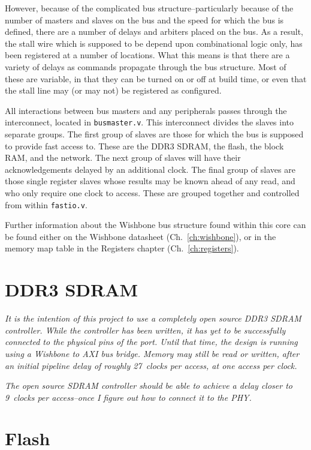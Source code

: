 \documentclass{gqtekspec}
\begin{document}
However, because of the complicated bus structure--particularly because of the
number of masters and slaves on the bus and the speed for which the bus is
defined, there are a number of delays and arbiters placed on the bus.  As a
result, the stall wire which is supposed to be depend upon combinational logic
only, has been registered at a number of locations.  What this means is that
there are a variety of delays as commands propagate through the bus structure.
Most of these are variable, in that they can be turned on or off at build time,
or even that the stall line may (or may not) be registered as configured.

All interactions between bus masters and any peripherals passes through the
interconnect, located in {\tt busmaster.v}.  This interconnect divides the
slaves into separate groups.  The first group of slaves are those for which the
bus is supposed to provide fast access to.  These are the DDR3 SDRAM, the
flash, the block RAM, and the network.  The next group of slaves will have their
acknowledgements delayed by an additional clock.  The final group of slaves
are those single register slaves whose results may be known ahead of any read,
and who only require one clock to access.  These are grouped together and
controlled from within {\tt fastio.v}.

Further information about the Wishbone bus structure found within this core
can be found either on the Wishbone datasheet (Ch.~\ref{ch:wishbone}), or in
the memory map table in the Registers chapter (Ch.~\ref{ch:registers}).

\section{DDR3 SDRAM}

{\em It is the intention of this project to use a completely open source
DDR3 SDRAM controller.  While the controller has been written, it has yet to
be successfully connected to the physical pins of the port.  Until that time,
the design is running using a Wishbone to AXI bus bridge.  Memory may still
be read or written, after an initial pipeline delay of roughly 27~clocks per
access, at one access per clock.}

{\em The open source SDRAM controller should be able to achieve a delay closer
to 9~clocks per access--once I figure out how to connect it to the PHY.}

\section{Flash}
\end{document}
